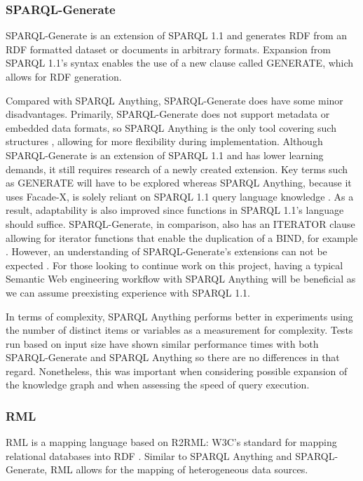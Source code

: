 \subsubsection{SPARQL-Generate}
\hspace{0.5cm} SPARQL-Generate is an extension of SPARQL 1.1 and generates RDF from an RDF formatted dataset or documents in arbitrary formats. Expansion from SPARQL 1.1's syntax enables the use of a new clause called GENERATE, which allows for RDF generation. \cite{lefranccois2017sparql}

Compared with SPARQL Anything, SPARQL-Generate does have some minor disadvantages. Primarily, SPARQL-Generate does not support metadata or embedded data formats, so SPARQL Anything is the only tool covering such structures \cite{sparqlanything}, allowing for more flexibility during implementation. Although SPARQL-Generate is an extension of SPARQL 1.1 and has lower learning demands, it still requires research of a newly created extension. Key terms such as GENERATE will have to be explored whereas SPARQL Anything, because it uses Facade-X, is solely reliant on SPARQL 1.1 query language knowledge \cite{sparqlanything}. As a result, adaptability is also improved since functions in SPARQL 1.1's language should suffice. SPARQL-Generate, in comparison, also has an ITERATOR clause allowing for iterator functions that enable the duplication of a BIND, for example \cite{lefranccois2017sparql}. However, an understanding of SPARQL-Generate's extensions can not be expected \cite{sparqlanything}. For those looking to continue work on this project, having a typical Semantic Web engineering workflow with SPARQL Anything will be beneficial as we can assume preexisting experience with SPARQL 1.1. 

In terms of complexity, SPARQL Anything performs better in experiments using the number of distinct items or variables as a measurement for complexity. Tests run based on input size have shown similar performance times with both SPARQL-Generate and SPARQL Anything so there are no differences in that regard\cite{sparqlanything}. Nonetheless, this was important when considering possible expansion of the knowledge graph and when assessing the speed of query execution. 

\subsubsection{RML}
\hspace{0.5cm} RML is a mapping language based on R2RML: W3C's standard for mapping relational databases into RDF \cite{dimou2014rml}. Similar to SPARQL Anything and SPARQL-Generate, RML allows for the mapping of heterogeneous data sources. 

